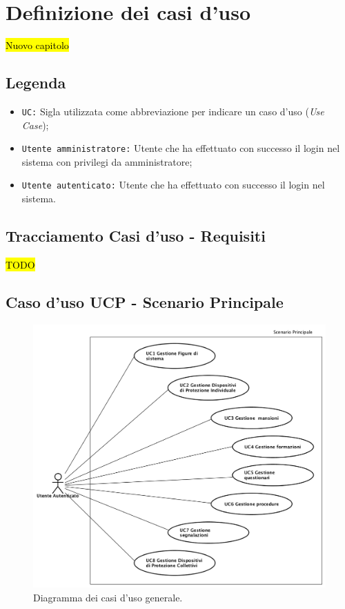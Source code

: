 \cleardoublepage

\section{Definizione dei casi d'uso}
\hl{Nuovo capitolo}
	\subsection{Legenda}
	\begin{itemize}
		\item \texttt{UC:} Sigla utilizzata come abbreviazione per indicare un caso d'uso (\textit{Use Case});
		\item \texttt{Utente amministratore:} Utente che ha effettuato con successo il login nel sistema con privilegi da amministratore;
		\item \texttt{Utente autenticato:} Utente che ha effettuato con successo il login nel sistema.
	\end{itemize}
	
	\subsection{Tracciamento Casi d'uso - Requisiti}
		\hl{TODO}
	\subsection{Caso d'uso UCP - Scenario Principale }
	\begin{figure}[H]
		\begin{center}
			\includegraphics[width=14cm]{Pics/Diagramma_generale_dei_casi_d_uso.png}
			\caption{
				Diagramma dei casi d'uso generale.}
			\label{fig:DiagrammaGeneraleCasiDuso}
		\end{center}
	\end{figure}	
	
